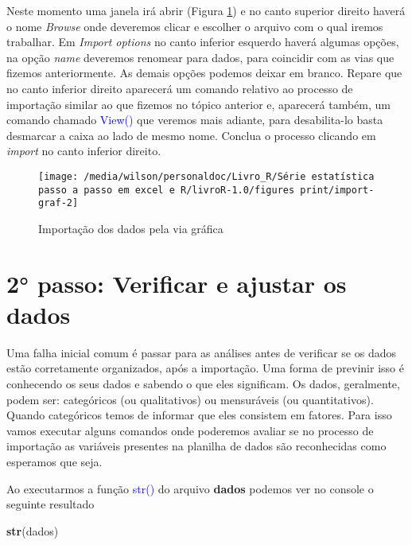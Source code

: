 \documentclass[14pt,titlepage, oneside, openany, a4paper]{book}
\newenvironment{Shaded}{\begin{snugshade}}{\end{snugshade}}
\newcommand{\KeywordTok}[1]{\textcolor[rgb]{0.13,0.29,0.53}{\textbf{#1}}}
\newcommand{\NormalTok}[1]{#1}
\begin{document}
Neste momento uma janela irá abrir (Figura \ref{fig:import-graf-2}) e no canto superior direito haverá o nome \emph{Browse} onde deveremos clicar e escolher o arquivo com o qual iremos trabalhar. Em \emph{Import options} no canto inferior esquerdo haverá algumas opções, na opção \emph{name} deveremos renomear para dados, para coincidir com as vias que fizemos anteriormente. As demais opções podemos deixar em branco. Repare que no canto inferior direito aparecerá um comando relativo ao processo de importação similar ao que fizemos no tópico anterior e, aparecerá também, um comando chamado \textcolor{blue}{View()} que veremos mais adiante, para desabilita-lo basta desmarcar a caixa ao lado de mesmo nome. Conclua o processo clicando em \emph{import} no canto inferior direito.

\begin{figure}[H]

{\centering \texttt{[image: /media/wilson/personaldoc/Livro\_R/Série estatística passo a passo em excel e R/livroR-1.0/figures print/import-graf-2]} 

}

\caption{Importação dos dados pela via gráfica}\label{fig:import-graf-2}
\end{figure}

\hypertarget{passo-verificar-e-ajustar-os-dados}{%
\section{2° passo: Verificar e ajustar os dados}\label{passo-verificar-e-ajustar-os-dados}}

Uma falha inicial comum é passar para as análises antes de verificar se os dados estão corretamente organizados, após a importação. Uma forma de previnir isso é conhecendo os seus dados e sabendo o que eles significam. Os dados, geralmente, podem ser: categóricos (ou qualitativos) ou mensuráveis (ou quantitativos). Quando categóricos temos de informar que eles consistem em fatores. Para isso vamos executar alguns comandos onde poderemos avaliar se no processo de importação as variáveis presentes na planilha de dados são reconhecidas como esperamos que seja.

Ao executarmos a função \textcolor{blue}{str()} do arquivo \textbf{dados} podemos ver no console o seguinte resultado

\begin{Shaded}
\begin{Highlighting}[]
\KeywordTok{str}\NormalTok{(dados)}
\end{Highlighting}
\end{Shaded}
\end{document}
